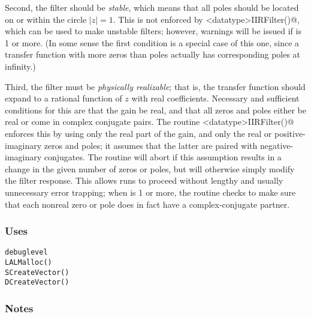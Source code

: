 Second, the filter should be \emph{stable}, which means that all poles
should be located on or within the circle $|z|=1$.  This is not
enforced by \verb@Create<datatype>IIRFilter()@, which can be used to
make unstable filters; however, warnings will be issued if
\verb@debuglevel@ is 1 or more.  (In some sense the first condition is
a special case of this one, since a transfer function with more zeros
than poles actually has corresponding poles at infinity.)

Third, the filter must be \emph{physically realizable}; that is, the
transfer function should expand to a rational function of $z$ with
real coefficients.  Necessary and sufficient conditions for this are
that the gain be real, and that all zeros and poles either be real or
come in complex conjugate pairs.  The routine
\verb@Create<datatype>IIRFilter()@ enforces this by using only the
real part of the gain, and only the real or positive-imaginary zeros
and poles; it assumes that the latter are paired with
negative-imaginary conjugates.  The routine will abort if this
assumption results in a change in the given number of zeros or poles,
but will otherwise simply modify the filter response.  This allows
 runs to proceed without lengthy and usually
unnecessary error trapping; when \verb@debuglevel@ is 1 or more, the
routine checks to make sure that each nonreal zero or pole does in
fact have a complex-conjugate partner.

\subsubsection{Uses}
\begin{verbatim}
debuglevel
LALMalloc()
SCreateVector()
DCreateVector()
\end{verbatim}

\subsubsection{Notes}


